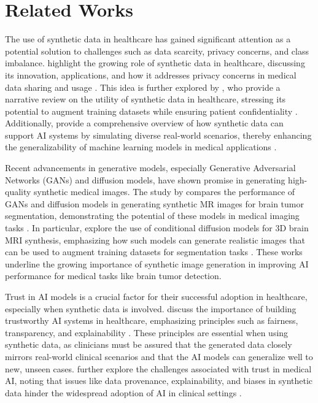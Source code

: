 \section{Related Works}
The use of synthetic data in healthcare has gained significant attention as a potential solution to challenges such as data scarcity, privacy concerns, and class imbalance. \cite{c1} highlight the growing role of synthetic data in healthcare, discussing its innovation, applications, and how it addresses privacy concerns in medical data sharing and usage . This idea is further explored by \cite{c2}, who provide a narrative review on the utility of synthetic data in healthcare, stressing its potential to augment training datasets while ensuring patient confidentiality . Additionally, \cite{c3} provide a comprehensive overview of how synthetic data can support AI systems by simulating diverse real-world scenarios, thereby enhancing the generalizability of machine learning models in medical applications .

Recent advancements in generative models, especially Generative Adversarial Networks (GANs) and diffusion models, have shown promise in generating high-quality synthetic medical images. The study by \cite{c9} compares the performance of GANs and diffusion models in generating synthetic MR images for brain tumor segmentation, demonstrating the potential of these models in medical imaging tasks . In particular, \cite{c6} explore the use of conditional diffusion models for 3D brain MRI synthesis, emphasizing how such models can generate realistic images that can be used to augment training datasets for segmentation tasks . These works underline the growing importance of synthetic image generation in improving AI performance for medical tasks like brain tumor detection.

Trust in AI models is a crucial factor for their successful adoption in healthcare, especially when synthetic data is involved. \cite{c7} discuss the importance of building trustworthy AI systems in healthcare, emphasizing principles such as fairness, transparency, and explainability . These principles are essential when using synthetic data, as clinicians must be assured that the generated data closely mirrors real-world clinical scenarios and that the AI models can generalize well to new, unseen cases. \cite{c10} further explore the challenges associated with trust in medical AI, noting that issues like data provenance, explainability, and biases in synthetic data hinder the widespread adoption of AI in clinical settings .

